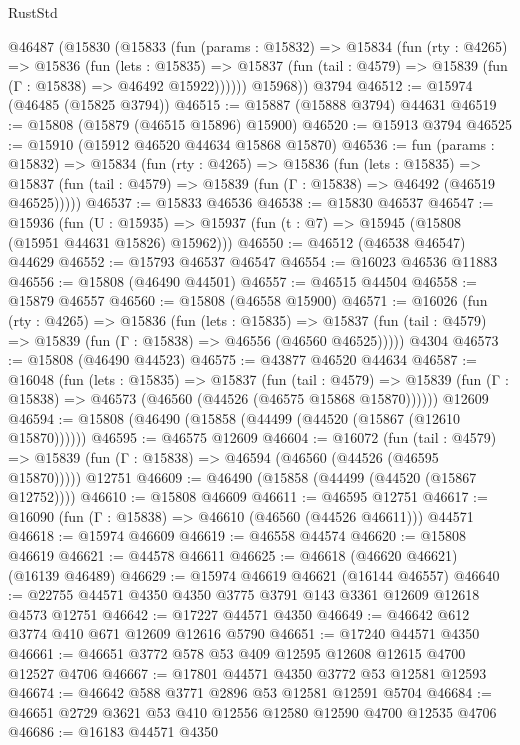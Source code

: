 \begin{lexlean}{RustStd}
\begin{coremodule}
    @46487
      (@15830
        (@15833
          (fun (params : @15832) =>
          @15834
            (fun (rty : @4265) =>
            @15836
              (fun (lets : @15835) =>
              @15837 (fun (tail : @4579) => @15839 (fun (Γ : @15838) => @46492 @15922))))))
        @15968))
    @3794
@46512 := @15974 (@46485 (@15825 @3794))
@46515 := @15887 (@15888 @3794) @44631
@46519 := @15808 (@15879 (@46515 @15896) @15900)
@46520 := @15913 @3794
@46525 := @15910 (@15912 @46520 @44634 @15868 @15870)
@46536 := fun (params : @15832) =>
  @15834
    (fun (rty : @4265) =>
    @15836
      (fun (lets : @15835) =>
      @15837 (fun (tail : @4579) => @15839 (fun (Γ : @15838) => @46492 (@46519 @46525)))))
@46537 := @15833 @46536
@46538 := @15830 @46537
@46547 := @15936
    (fun (U : @15935) => @15937 (fun (t : @7) => @15945 (@15808 (@15951 @44631 @15826) @15962)))
@46550 := @46512 (@46538 @46547) @44629
@46552 := @15793 @46537 @46547
@46554 := @16023 @46536 @11883
@46556 := @15808 (@46490 @44501)
@46557 := @46515 @44504
@46558 := @15879 @46557
@46560 := @15808 (@46558 @15900)
@46571 := @16026
    (fun (rty : @4265) =>
    @15836
      (fun (lets : @15835) =>
      @15837 (fun (tail : @4579) => @15839 (fun (Γ : @15838) => @46556 (@46560 @46525)))))
    @4304
@46573 := @15808 (@46490 @44523)
@46575 := @43877 @46520 @44634
@46587 := @16048
    (fun (lets : @15835) =>
    @15837
      (fun (tail : @4579) =>
      @15839 (fun (Γ : @15838) => @46573 (@46560 (@44526 (@46575 @15868 @15870))))))
    @12609
@46594 := @15808 (@46490 (@15858 (@44499 (@44520 (@15867 (@12610 @15870))))))
@46595 := @46575 @12609
@46604 := @16072
    (fun (tail : @4579) => @15839 (fun (Γ : @15838) => @46594 (@46560 (@44526 (@46595 @15870)))))
    @12751
@46609 := @46490 (@15858 (@44499 (@44520 (@15867 @12752))))
@46610 := @15808 @46609
@46611 := @46595 @12751
@46617 := @16090 (fun (Γ : @15838) => @46610 (@46560 (@44526 @46611))) @44571
@46618 := @15974 @46609
@46619 := @46558 @44574
@46620 := @15808 @46619
@46621 := @44578 @46611
@46625 := @46618 (@46620 @46621) (@16139 @46489)
@46629 := @15974 @46619 @46621 (@16144 @46557)
@46640 := @22755 @44571 @4350 @4350 @3775 @3791 @143 @3361 @12609 @12618 @4573 @12751
@46642 := @17227 @44571 @4350
@46649 := @46642 @612 @3774 @410 @671 @12609 @12616 @5790
@46651 := @17240 @44571 @4350
@46661 := @46651 @3772 @578 @53 @409 @12595 @12608 @12615 @4700 @12527 @4706
@46667 := @17801 @44571 @4350 @3772 @53 @12581 @12593
@46674 := @46642 @588 @3771 @2896 @53 @12581 @12591 @5704
@46684 := @46651 @2729 @3621 @53 @410 @12556 @12580 @12590 @4700 @12535 @4706
@46686 := @16183 @44571 @4350

\end{coremodule}
\end{lexlean}
